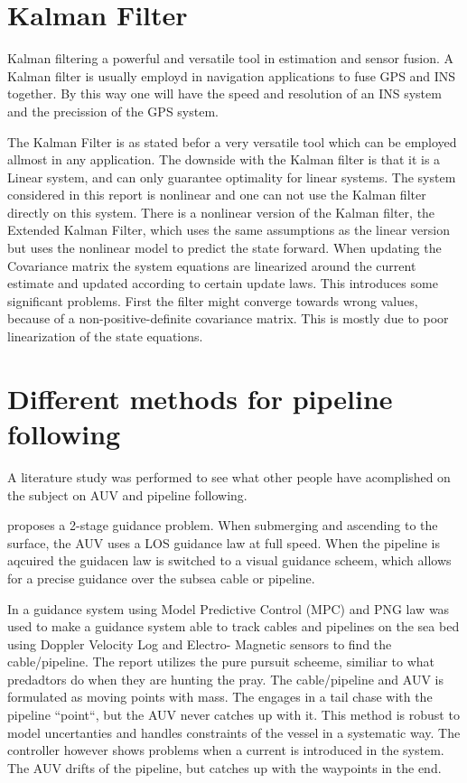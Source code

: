\section{Kalman Filter}
	Kalman filtering a powerful and versatile tool in estimation and sensor fusion. A Kalman filter is usually 
	employd in navigation applications to fuse GPS and INS together. By this way one will have the speed and 
	resolution of an INS system and the precission of the GPS system. 

	The Kalman Filter is as stated befor a very versatile tool which can be employed allmost in any application. 
	The downside with the Kalman filter is that it is a Linear system, and can only guarantee optimality for linear 
	systems. The system considered in this report is nonlinear and one can not use the Kalman filter directly on 
	this system. There is a nonlinear version of the Kalman filter, the Extended Kalman Filter, which uses the same 
	assumptions as the linear version but uses the nonlinear model to predict the state forward. When updating the 
	Covariance matrix the system equations are linearized around the current estimate and updated according to certain 
	update laws. This introduces some significant problems. First the filter might converge towards wrong values, 
	because of a non-positive-definite covariance matrix. This is mostly due to poor linearization of the 
	state equations. \cite{kalman}
	
	
\section{Different methods for pipeline following}
	A literature study was performed to see what other people have acomplished on the subject on AUV and 
	pipeline following. 
	
	\cite{GuidanceReview} proposes a 2-stage guidance problem. When submerging and ascending to the surface, 
	the AUV uses a LOS guidance law at full speed. When the pipeline is aqcuired the guidacen law is switched 
	to a visual guidance scheem, which allows for a precise guidance over the subsea cable or pipeline. 
		
	In \cite{MPC_pure_pursuit} a guidance system using Model Predictive Control (MPC) and PNG law was used to make 
	a guidance system able to track cables and pipelines on the sea bed using Doppler Velocity Log and Electro-
	Magnetic sensors to find the cable/pipeline. The report utilizes the pure pursuit scheeme, similiar to what 
	predadtors do when they are hunting the pray. The cable/pipeline and AUV is formulated as moving points with 
	mass. The engages in a tail chase with the pipeline ``point``, but the AUV never catches up with it. This 
	method is robust to model uncertanties and handles constraints of the vessel in a systematic way. The controller
	however shows problems when a current is introduced in the system. The AUV drifts of the pipeline, but catches 
	up with the waypoints in the end.
	

